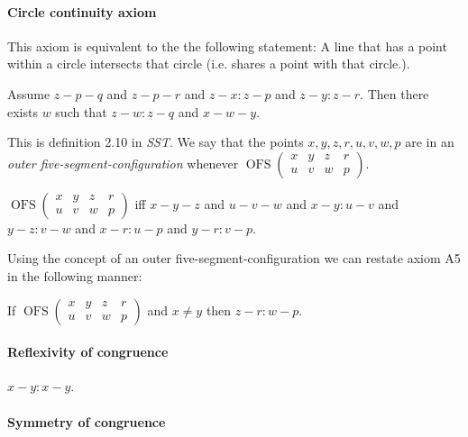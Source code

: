 \documentclass{article}
\newcommand{\OFS}[8]{\operatorname{OFS}
\left(\begin{smallmatrix}%
#1 & #2 & #3 & #4 \\
#5 & #6 & #7 & #8
\end{smallmatrix}\right)%
}
\begin{document}
  \paragraph{Circle continuity axiom} This axiom is equivalent to the the following statement: A line that has a point within a circle intersects that circle (i.e. shares a point with that circle.).

  \begin{forthel}
    \begin{axiom}[CA]
      Assume $z-p-q$ and $z-p-r$ and $z-x : z-p$ and $z-y : z-r$. Then there exists $w$ such that $z-w : z-q$ and $x-w-y$.
    \end{axiom}
  \end{forthel}


  This is definition 2.10 in \textit{SST}.
  We say that the points $x,y,z,r,u,v,w,p$ are in an \textit{outer five-segment-configuration} whenever $\OFS{x}{y}{z}{r}{u}{v}{w}{p}$.

  \begin{forthel}
    \begin{definition}[OFS]
      $\OFS{x}{y}{z}{r}{u}{v}{w}{p}$ iff $x-y-z$ and $u-v-w$ and $x-y : u-v$ and $y-z : v-w$ and $x-r : u-p$ and $y-r : v-p$.
    \end{definition}
  \end{forthel}

  Using the concept of an outer five-segment-configuration we can restate axiom A5 in the following manner:

  \begin{forthel}
  \begin{axiom}[Alt5]
    If $\OFS{x}{y}{z}{r}{u}{v}{w}{p}$ and $x \neq y$ then $z-r : w-p$.
  \end{axiom}
  \end{forthel}




  \paragraph{Reflexivity of congruence}

  \begin{forthel}
    \begin{lemma}[L2o1]
      $x-y : x-y$.
    \end{lemma}
  \end{forthel}


  \paragraph{Symmetry of congruence}
\end{document}
